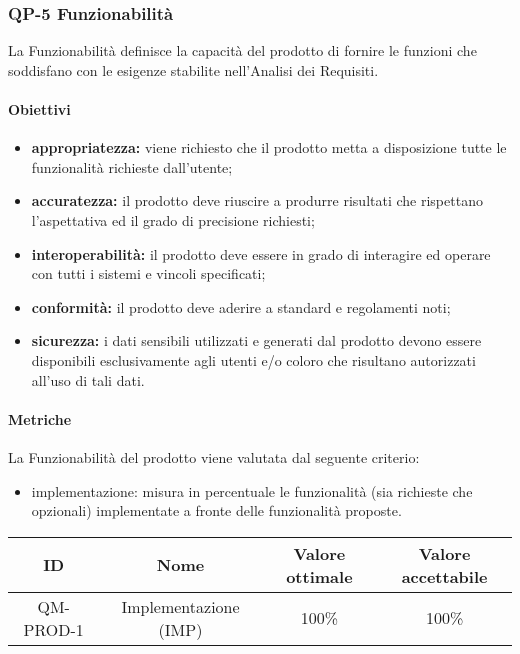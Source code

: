 \subsubsection{QP-5 Funzionabilità}
	La Funzionabilità definisce la capacità del prodotto di fornire le funzioni che soddisfano con le esigenze stabilite nell'Analisi dei Requisiti.
	\paragraph{Obiettivi}
		\begin{itemize}
			\item \textbf{appropriatezza:} viene richiesto che il prodotto metta a disposizione tutte le funzionalità richieste dall'utente;
			\item \textbf{accuratezza:} il prodotto deve riuscire a produrre risultati che rispettano l'aspettativa ed il grado di precisione richiesti;
			\item \textbf{interoperabilità:} il prodotto deve essere in grado di interagire ed operare con tutti i sistemi e vincoli specificati;
			\item \textbf{conformità:} il prodotto deve aderire a standard e regolamenti noti;
			\item \textbf{sicurezza:} i dati sensibili utilizzati e generati dal prodotto devono essere disponibili esclusivamente agli utenti e/o coloro che risultano autorizzati all'uso di tali dati.
		\end{itemize}
	\paragraph{Metriche}
	La Funzionabilità del prodotto viene valutata dal seguente criterio:
	\begin{itemize}
		\item implementazione: misura in percentuale le funzionalità (sia richieste che opzionali) implementate a fronte delle funzionalità proposte.
	\end{itemize}
	\begin{center}
		\begin{tabular}{|c|c|c|c|}
			\hline
			ID & Nome & Valore ottimale & Valore accettabile \\
			\hline
			QM-PROD-1 & Implementazione (IMP)  & 100\% & 100\% \\
			\hline
		\end{tabular}
	\end{center}
